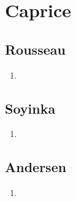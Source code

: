 \documentclass[a4paper, 11pt, hidelinks]{article}
\begin{document}
\section{Caprice}



\subsection{Rousseau}


\begin{enumerate}
    \item 
\end{enumerate}



\subsection{Soyinka}


\begin{enumerate}
    \item 
\end{enumerate}




\subsection{Andersen}


\begin{enumerate}
    \item 
\end{enumerate}
\end{document}
